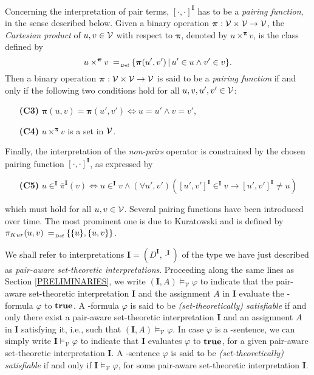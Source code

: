 \documentclass[manyauthors]{fundam}
\newcommand{\nonpairssym}{\bar{\pi}}
\newcommand{\inter}{\ensuremath{\mathbf{I}}\xspace}
\newcommand{\vmodels}[2]{#1 \models_{\mathcal{V}} #2}
\newcommand{\vsat}[1]{\vmodels{*}{#1}}
\begin{document}
Concerning the interpretation of pair terms, $[\cdot,\cdot]^{\inter}$ 
has to be a \emph{pairing function},
in the sense described below.
Given a binary operation $\boldsymbol{\pi}: \mathcal{V} \times \mathcal{V} 
\rightarrow \mathcal{V}$, the \emph{Cartesian product} of $u, v \in \mathcal{V}$ 
with
respect to $\boldsymbol{\pi}$, denoted by $u 
\times^{\boldsymbol{\pi}} v$, is the class defined by
\[
u \times^{\boldsymbol{\pi}} v \defAs \{ \boldsymbol{\pi}(u',v') \,|\, 
u' \in u \wedge v' \in v \}.
\]
Then a binary operation $\boldsymbol{\pi}: \mathcal{V} \times \mathcal{V} 
\rightarrow \mathcal{V}$ is said to be a \emph{pairing function} if
and only if the following two conditions hold for all $u,v,u',v' \in
\mathcal{V}$:
\begin{enumerate}[leftmargin=.9cm]
  \item[\textbf{(C3)}]$\boldsymbol{\pi}(u,v)=\boldsymbol{\pi}(u',v') 
\iff u=u' \wedge v=v'$,
  \item[\textbf{(C4)}]$u \times^{\boldsymbol{\pi}} v$ is a set in $\mathcal{V}$.
\end{enumerate}
Finally, the interpretation of the
\emph{non-pairs} operator is constrained by the chosen
pairing function $[\cdot,\cdot]^\inter$, as expressed by
\begin{enumerate}[leftmargin=.9cm]
  \item[\textbf{(C5)}]\label{NONPAIR}
$u \in^{\inter} \nonpairssym^{\inter}(v) \iff u \in^{\inter} v \wedge 
(\forall u', v')([u', v']^{\inter} \in^{\inter} v \rightarrow [u', 
v']^{\inter}\neq u)
$
\end{enumerate}
which must hold for all $u,v \in \mathcal{V}$. Several pairing
functions have been %
introduced over time. 
The most prominent one is due to Kuratowski and is defined by $\pi_{Kur}(u, v)
\defAs \{\{u\}, \{u,v\}\}$.

We shall refer to interpretations $\inter=(D^{\inter}, \cdot^\inter)$ 
of the type we have just described as
\emph{pair-aware set-theoretic interpretations}. Proceeding along the same lines as Section \ref{PRELIMINARIES},  we write 
$\vmodels{(\inter, A)}{\varphi}$ to indicate that the pair-aware set-theoretic interpretation $\inter$ and the assignment $A$ in $\inter$ evaluate the \Forallpizero-formula $\varphi$ to $\mathbf{true}$. A \Forallpizero-formula $\varphi$ is said to be
\emph{(set-theoretically) satisfiable}
if and only there exist a pair-aware
set-theoretic interpretation $\inter$ and an assignment $A$ in $\inter$ satisfying it,
i.e., such that $\vmodels{(\inter,A)}{\varphi}$. In case $\varphi$ is a 
\Forallpizero-sentence, we can simply write $\vmodels{\inter}{\varphi}$ to indicate that $\inter$ evaluates $\varphi$ to $\mathbf{true}$, for a given  
pair-aware set-theoretic interpretation $\inter$. A \Forallpizero-sentence $\varphi$ is said to be
\emph{(set-theoretically) satisfiable} if and only if $\vmodels{\inter}{\varphi}$, for some 
pair-aware set-theoretic interpretation $\inter$. 
\end{document}
